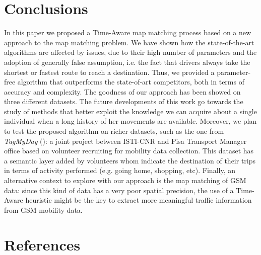 \documentclass[5p]{elsarticle}
\begin{document}
\section{Conclusions}
In this paper we proposed a Time-Aware map matching process based on a new approach to the map matching problem. 
We have shown how the state-of-the-art algorithms are
affected by issues, due to their high number of parameters and the adoption of generally false assumption, i.e. the fact that drivers always take the shortest or fastest route to reach a destination. 
Thus, we provided a parameter-free algorithm 
that outperforms the state-of-art competitors, both in terms of accuracy and complexity. The goodness of our approach has been showed 
on three different datasets. 
The future developments of this work go towards the study of methods that better exploit the knowledge we can acquire about a single individual when a long history of her movements are available. Moreover, we plan to test
the proposed algorithm on richer datasets, such as the one from \textit{TagMyDay} (\cite{tagmyday}): a joint project 
between ISTI-CNR and Pisa Transport Manager office based on volunteer recruiting for
mobility data collection. This dataset has a semantic layer added by volunteers whom indicate the destination of their trips in terms 
of activity performed (e.g. going home, shopping, etc). 
Finally, an alternative context to explore with our approach is the map matching of GSM data: since this kind of data has a very poor spatial precision, the use of a Time-Aware heuristic might be the key to extract more meaningful traffic information from GSM mobility data. 




























\clearpage







\section*{References}

{}
\end{document}
